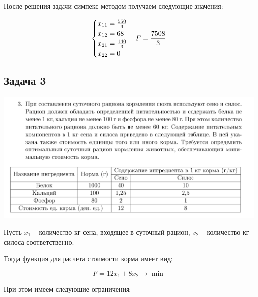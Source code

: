 \documentclass[9pt, a4paper]{article}
\begin{document}
    После решения задачи симпекс-методом получаем следующие значения:

    \begin{equation}
        \begin{cases}
            x_{11} = \frac{550}{3}\\
            x_{12} = 68\\
            x_{21} = \frac{140}{3}\\
            x_{22} = 0\\
        \end{cases}\label{eq:equation16}
        \newline
        F = \frac{7508}{3}
    \end{equation}

    \newpage

    \subsection{Задача 3}\label{subsec:task3}
    \includegraphics[width=1\textwidth]{docs/3}

    Пусть $x_1$ -- количество кг сена, входящее в суточный рацион,
    $x_2$ -- количество кг силоса соответственно.

    Тогда функция для расчета стоимости корма имеет вид:

    \begin{equation}
        F = 12x_1 + 8x_2 \rightarrow \min\label{eq:equation17}
    \end{equation}

    При этом имеем следующие ограничения:
\end{document}

